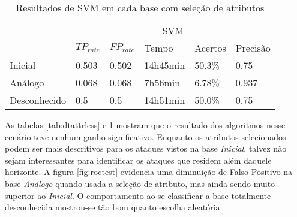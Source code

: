 \begin{table}[h]
    \centering
    \caption{Resultados de SVM em cada base com seleção de atributos}
    \label{tab:svmattrless}
    \begin{tabular}{l|l|l|l|l|l|}
        \cline{2-6}
                                                                   & \multicolumn{5}{c|}{\cellcolor[HTML]{C0C0C0}SVM}          \\ \cline{2-6}
                                                                   & $TP_{rate}$ & $FP_{rate}$ & Tempo    & Acertos & Precisão \\ \hline
        \multicolumn{1}{|l|}{\cellcolor[HTML]{EFEFEF}Inicial}      & 0.503       & 0.502       & 14h45min & 50.3\%  & 0.75     \\ \hline
        \multicolumn{1}{|l|}{\cellcolor[HTML]{EFEFEF}Análogo}      & 0.068       & 0.068       & 7h56min  & 6.78\%  & 0.937    \\ \hline
        \multicolumn{1}{|l|}{\cellcolor[HTML]{EFEFEF}Desconhecido} & 0.5         & 0.5         & 14h51min & 50.0\%  & 0.75     \\ \hline
    \end{tabular}
\end{table}

As tabelas \ref{tab:dtattrless} e \ref{tab:svmattrless} mostram que o resultado dos algoritmos nesse
cenário teve nenhum ganho significativo. Enquanto os atributos selecionados podem ser mais descritivos para os
ataques vistos na base \textit{Inicial}, talvez não sejam interessantes para identificar os ataques que residem além
daquele horizonte.
 A figura \ref{fig:roctest} evidencia uma diminuição de Falso Positivo na base \emph{Análogo}
 quando usada a seleção de atributo, mas ainda sendo muito superior ao \textit{Inicial}. O comportamento
 ao se classificar a base totalmente desconhecida mostrou-se tão bom quanto escolha aleatória.

